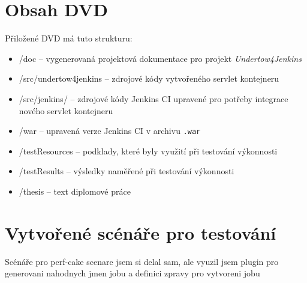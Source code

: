 
\chapter{Obsah DVD}
    Přiložené DVD má tuto strukturu:
    \begin{itemize}
        \item /doc -- vygenerovaná projektová dokumentace pro projekt \emph{Undertow4Jenkins}
        \item /src/undertow4jenkins -- zdrojové kódy vytvořeného servlet kontejneru
        \item /src/jenkins/ -- zdrojové kódy Jenkins CI upravené pro potřeby integrace nového servlet kontejneru
        \item /war -- upravená verze Jenkins CI v archivu \texttt{.war} 
        \item /testResources -- podklady, které byly využití při testování výkonnosti
        \item /testResults -- výsledky naměřené při testování výkonnosti
        \item /thesis -- text diplomové práce
    \end{itemize}

\chapter{Vytvořené scénáře pro testování} \label{prilohaScenare}
    Scénáře pro perf-cake
    scenare jsem si delal sam, ale vyuzil jsem plugin pro generovani nahodnych jmen jobu a definici zpravy pro vytvoreni jobu



